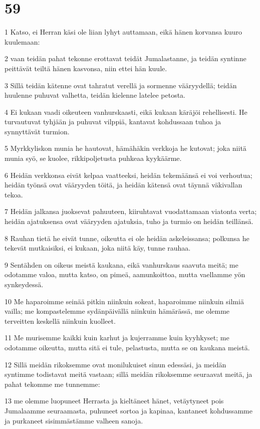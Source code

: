 \chapter{59}

\par 1 Katso, ei Herran käsi ole liian lyhyt auttamaan, eikä hänen korvansa kuuro kuulemaan:
\par 2 vaan teidän pahat tekonne erottavat teidät Jumalastanne, ja teidän syntinne peittävät teiltä hänen kasvonsa, niin ettei hän kuule.
\par 3 Sillä teidän kätenne ovat tahratut verellä ja sormenne vääryydellä; teidän huulenne puhuvat valhetta, teidän kielenne latelee petosta.
\par 4 Ei kukaan vaadi oikeuteen vanhurskaasti, eikä kukaan käräjöi rehellisesti. He turvautuvat tyhjään ja puhuvat vilppiä, kantavat kohdussaan tuhoa ja synnyttävät turmion.
\par 5 Myrkkyliskon munia he hautovat, hämähäkin verkkoja he kutovat; joka niitä munia syö, se kuolee, rikkipoljetusta puhkeaa kyykäärme.
\par 6 Heidän verkkonsa eivät kelpaa vaatteeksi, heidän tekemäänsä ei voi verhoutua; heidän työnsä ovat vääryyden töitä, ja heidän kätensä ovat täynnä väkivallan tekoa.
\par 7 Heidän jalkansa juoksevat pahuuteen, kiiruhtavat vuodattamaan viatonta verta; heidän ajatuksensa ovat vääryyden ajatuksia, tuho ja turmio on heidän teillänsä.
\par 8 Rauhan tietä he eivät tunne, oikeutta ei ole heidän askeleissansa; polkunsa he tekevät mutkaisiksi, ei kukaan, joka niitä käy, tunne rauhaa.
\par 9 Sentähden on oikeus meistä kaukana, eikä vanhurskaus saavuta meitä; me odotamme valoa, mutta katso, on pimeä, aamunkoittoa, mutta vaellamme yön synkeydessä.
\par 10 Me haparoimme seinää pitkin niinkuin sokeat, haparoimme niinkuin silmiä vailla; me kompastelemme sydänpäivällä niinkuin hämärässä, me olemme terveitten keskellä niinkuin kuolleet.
\par 11 Me murisemme kaikki kuin karhut ja kujerramme kuin kyyhkyset; me odotamme oikeutta, mutta sitä ei tule, pelastusta, mutta se on kaukana meistä.
\par 12 Sillä meidän rikoksemme ovat monilukuiset sinun edessäsi, ja meidän syntimme todistavat meitä vastaan; sillä meidän rikoksemme seuraavat meitä, ja pahat tekomme me tunnemme:
\par 13 me olemme luopuneet Herrasta ja kieltäneet hänet, vetäytyneet pois Jumalaamme seuraamasta, puhuneet sortoa ja kapinaa, kantaneet kohdussamme ja purkaneet sisimmästämme valheen sanoja.
